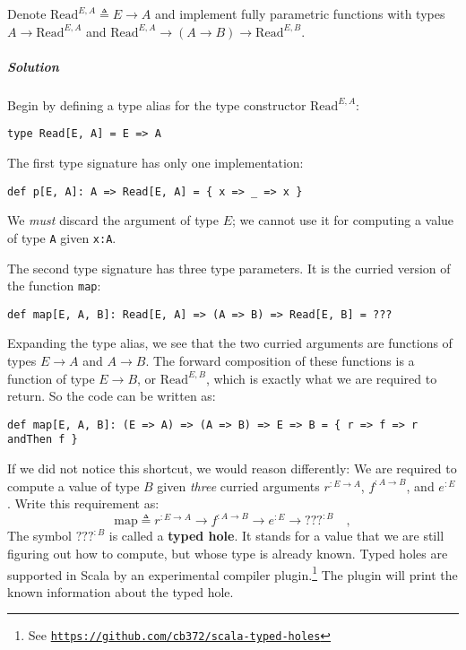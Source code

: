 Denote $\text{Read}^{E,A}\triangleq E\rightarrow A$ and implement
fully parametric functions with types $A\rightarrow\text{Read}^{E,A}$
and $\text{Read}^{E,A}\rightarrow(A\rightarrow B)\rightarrow\text{Read}^{E,B}$.

\subparagraph{Solution}

Begin by defining a type alias for the type constructor $\text{Read}^{E,A}$:
\begin{lstlisting}
type Read[E, A] = E => A
\end{lstlisting}
The first type signature has only one implementation:
\begin{lstlisting}
def p[E, A]: A => Read[E, A] = { x => _ => x }
\end{lstlisting}
We \emph{must} discard the argument of type $E$; we cannot use it
for computing a value of type \lstinline!A! given \lstinline!x:A!.

The second type signature has three type parameters. It is the curried
version of the function \lstinline!map!:
\begin{lstlisting}
def map[E, A, B]: Read[E, A] => (A => B) => Read[E, B] = ???
\end{lstlisting}
Expanding the type alias, we see that the two curried arguments are
functions of types $E\rightarrow A$ and $A\rightarrow B$. The forward
composition of these functions is a function of type $E\rightarrow B$,
or $\text{Read}^{E,B}$, which is exactly what we are required to
return. So the code can be written as:

\begin{lstlisting}
def map[E, A, B]: (E => A) => (A => B) => E => B = { r => f => r andThen f }
\end{lstlisting}
If we did not notice this shortcut, we would reason differently: We
are required to compute a value of type $B$ given \emph{three} curried
arguments $r^{:E\rightarrow A}$, $f^{:A\rightarrow B}$, and $e^{:E}$.
Write this requirement as:
\[
\text{map}\triangleq r^{:E\rightarrow A}\rightarrow f^{:A\rightarrow B}\rightarrow e^{:E}\rightarrow???^{:B}\quad,
\]
The symbol $\text{???}^{:B}$ is called a \textbf{typed
hole}. It stands for a value that we are still figuring out how to
compute, but whose type is already known. Typed holes are supported
in Scala by an experimental compiler plugin.\footnote{See \texttt{\href{https://github.com/cb372/scala-typed-holes}{https://github.com/cb372/scala-typed-holes}}}
The plugin will print the known information about the typed hole.

